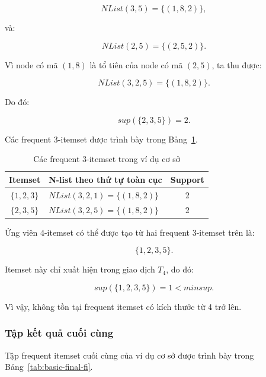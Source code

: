 \begin{equation}
    NList(3,5)=\{(1,8,2)\},
\end{equation}

và:

\begin{equation}
    NList(2,5)=\{(2,5,2)\}.
\end{equation}

Vì node có mã $(1,8)$ là tổ tiên của node có mã $(2,5)$, ta thu được:

\begin{equation}
    NList(3,2,5)=\{(1,8,2)\}.
    \label{eq:basic-nlist-325}
\end{equation}

Do đó:

\begin{equation}
    sup(\{2,3,5\})=2.
    \label{eq:basic-support-235}
\end{equation}

Các frequent 3-itemset được trình bày trong Bảng~\ref{tab:basic-frequent-3-itemsets}.

\begin{table}[H]
\centering
\caption{Các frequent 3-itemset trong ví dụ cơ sở}
\label{tab:basic-frequent-3-itemsets}
\begin{tabular}{clc}
\toprule
Itemset & N-list theo thứ tự toàn cục & Support \\
\midrule
$\{1,2,3\}$ & $NList(3,2,1)=\{(1,8,2)\}$ & 2 \\
$\{2,3,5\}$ & $NList(3,2,5)=\{(1,8,2)\}$ & 2 \\
\bottomrule
\end{tabular}
\end{table}

Ứng viên 4-itemset có thể được tạo từ hai frequent 3-itemset trên là:

\[
\{1,2,3,5\}.
\]

Itemset này chỉ xuất hiện trong giao dịch $T_4$, do đó:

\begin{equation}
    sup(\{1,2,3,5\})=1<\mathit{minsup}.
\end{equation}

Vì vậy, không tồn tại frequent itemset có kích thước từ 4 trở lên.

\subsubsection{Tập kết quả cuối cùng}

Tập frequent itemset cuối cùng của ví dụ cơ sở được trình bày trong Bảng~\ref{tab:basic-final-fi}.

